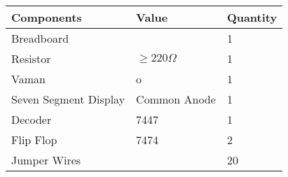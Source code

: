 \begin{tabular}{|p{4cm}|p{3cm}|p{3cm}|}
\hline                                        
\textbf{Components} & \textbf{Value} & \textbf{Quantity}\\                                          
\hline                                 
Breadboard &      & 1 \\           
\hline                                    
Resistor & $ \geq 220\Omega $ & 1 \\     
\hline                      
Vaman & o & 1 \\       
\hline                                     
Seven Segment Display & Common Anode & 1\\
\hline                      
Decoder & 7447 & 1 \\        
\hline                     
Flip Flop & 7474 & 2 \\
\hline                        
Jumper Wires &    & 20\\   
	\hline
\end{tabular}
